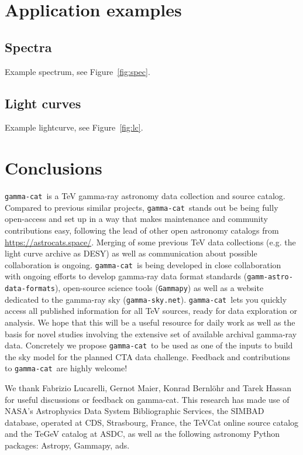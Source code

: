 \documentclass[11pt,twoside]{article}
\newcommand{\gammacat}{\texttt{gamma-cat}}
\newcommand{\gammapy}{\texttt{Gammapy}}
\newcommand{\gadf}{\texttt{gamm-astro-data-formats}}
\newcommand{\gammasky}{\texttt{gamma-sky.net}}
\begin{document}
\section{Application examples}

\subsection{Spectra}

Example spectrum, see Figure~\ref{fig:spec}.


\subsection{Light curves}

Example lightcurve, see Figure~\ref{fig:lc}.


\section{Conclusions}

\gammacat\ is a TeV gamma-ray astronomy data collection and source catalog. Compared to previous similar projects, \gammacat\ stands out be being fully open-access and set up in a way that makes maintenance and community contributions easy, following the lead of other open astronomy catalogs from \url{https://astrocats.space/}. Merging of some previous TeV data collections (e.g. the light curve archive as DESY) as well as communication about possible collaboration is ongoing. \gammacat\ is being developed in close collaboration with ongoing efforts to develop gamma-ray data format standards (\gadf), open-source science tools (\gammapy) as well as a website dedicated to the gamma-ray sky (\gammasky). \gammacat\ lets you quickly access all published information for all TeV sources, ready for data exploration or analysis. We hope that this will be a useful resource for daily work as well as the basis for novel studies involving the extensive set of available archival gamma-ray data. Concretely we propose \gammacat\ to be used as one of the inputs to build the sky model for the planned CTA data challenge. Feedback and contributions to \gammacat\ are highly welcome!


\acknowledgements We thank Fabrizio Lucarelli, Gernot Maier, Konrad Bernl\"ohr and Tarek Hassan for useful discussions or feedback on gamma-cat.
This research has made use of NASA's Astrophysics Data System Bibliographic Services, the SIMBAD database, operated at CDS, Strasbourg, France, the TeVCat online source catalog and the TeGeV catalog at ASDC, as well as the following astronomy Python packages: Astropy, Gammapy, ads.


\end{document}
